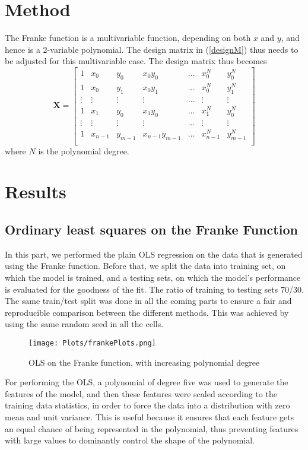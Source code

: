 \documentclass{article}
\begin{document}
\section{Method}
The Franke function is a multivariable function, depending on both $x$ and $y$, and hence is a 2-variable polynomial. The design matrix in (\ref{designM}) thus needs to be adjusted for this multivariable case. The design matrix thus becomes  
$$\textbf{X} = \begin{bmatrix}
1 & x_{0} & y_{0} & x_{0}y_{0} & \dots & x_{0}^{N} & y_{0}^{N}     \\
1 & x_{0} & y_{1} & x_{0}y_{1} & \dots & x_{0}^{N} & y_{1}^{N}  \\
\vdots & \vdots & \vdots & \vdots & \dots & \vdots & \vdots \\
1 & x_{1} & y_{0} & x_{1}y_{0} & \dots & x_{1}^{N} & y_{0}^{N} \\
\vdots & \vdots & \vdots & \vdots & \dots & \vdots & \vdots \\
1 & x_{n-1} & y_{m-1} & x_{n-1}y_{m-1} & \dots & x_{n-1}^{N} & y_{m-1}^{N} \\
\end{bmatrix}$$
where $N$ is the polynomial degree.

\section{Results}
\subsection{Ordinary least squares on the Franke Function}
In this part, we performed the plain OLS regression on the data that is generated using the Franke function. Before that, we split the data into training set, on which the model is trained, and a testing sets, on which the model’s performance is evaluated for the goodness of the fit. The ratio of training to testing sets 70/30. The same train/test split was done in all the coming parts to ensure a fair and reproducible comparison between the different methods. This was achieved by using the same random seed in all the cells.

\begin{figure}[h]
\texttt{[image: Plots/frankePlots.png]}
\caption{OLS on the Franke function, with increasing polynomial degree}
\end{figure}

For performing the OLS, a polynomial of degree five was used to generate the features of the model, and then these features were scaled according to the training data statistics, in order to force the data into a distribution with zero mean and unit variance. This is useful because it ensures that each feature gets an equal chance of being represented in the polynomial, thus preventing features with large values to dominantly control the shape of the polynomial.
\end{document}
